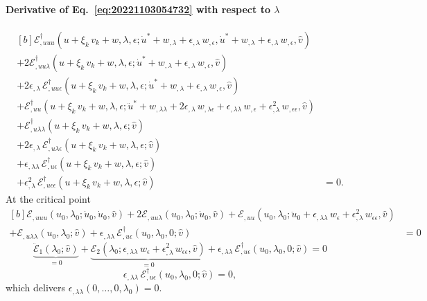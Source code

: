\documentclass[12pt, final]{scrartcl}
\theoremstyle{definition}
\newcommand{\E}{\mathcal E}
\newcommand{\EE}{\mathcal E ^ \dagger}
\begin{document}
\paragraph{Derivative of Eq.~\eqref{eq:20221103054732} with respect to \(\lambda\)}
\begin{equation}
  \begin{aligned}[b]
    \EE_{,uuu}(u + \xi_k \, v_k + w, \lambda, \epsilon; \dot{u}^\ast + w_{,\lambda} + \epsilon_{,\lambda} \, w_{,\epsilon}, \dot{u}^\ast + w_{,\lambda} + \epsilon_{,\lambda} \, w_{,\epsilon}, \hat{v}) &\\
    + 2\EE_{,uu\lambda}(u + \xi_k \, v_k + w, \lambda, \epsilon; \dot{u}^\ast + w_{,\lambda} + \epsilon_{,\lambda} \, w_{,\epsilon}, \hat{v}) &\\
    + 2\epsilon_{,\lambda} \, \EE_{,uu\epsilon}(u + \xi_k \, v_k + w, \lambda, \epsilon; \dot{u}^\ast + w_{,\lambda} + \epsilon_{,\lambda} \, w_{,\epsilon}, \hat{v}) &\\
    + \EE_{,uu}(u + \xi_k \, v_k + w, \lambda, \epsilon; \ddot{u}^\ast + w_{,\lambda\lambda} + 2\epsilon_{,\lambda} \, w_{,\lambda\epsilon} + \epsilon_{,\lambda\lambda} \, w_{,\epsilon} + \epsilon_{,\lambda}^2 \, w_{,\epsilon\epsilon}, \hat{v}) &\\
    + \EE_{,u\lambda\lambda}(u + \xi_k \, v_k + w, \lambda, \epsilon; \hat{v})&\\
    + 2\epsilon_{,\lambda} \, \EE_{,u\lambda\epsilon}(u + \xi_k \, v_k + w, \lambda, \epsilon; \hat{v}) &\\
    + \epsilon_{,\lambda\lambda} \, \EE_{,u\epsilon}(u + \xi_k \, v_k + w, \lambda, \epsilon; \hat{v}) &\\
    + \epsilon_{,\lambda}^2 \, \EE_{,u\epsilon\epsilon}(u + \xi_k \, v_k + w, \lambda, \epsilon; \hat{v}) &= 0.
  \end{aligned}
\end{equation}
At the critical point
\begin{equation*}
  \begin{aligned}[b]
    \E_{,uuu}(u_0, \lambda_0; \dot{u}_0, \dot{u}_0, \hat{v}) + 2\E_{,uu\lambda}(u_0, \lambda_0; \dot{u}_0, \hat{v}) + \E_{,uu}(u_0, \lambda_0; \ddot{u}_0 + \epsilon_{,\lambda\lambda} \, w_\epsilon + \epsilon_{,\lambda}^2 \, w_{\epsilon\epsilon}, \hat{v}) &\\
    + \E_{,u\lambda\lambda}(u_0, \lambda_0; \hat{v}) + \epsilon_{,\lambda\lambda} \, \EE_{,u\epsilon}(u_0, \lambda_0, 0; \hat{v}) &= 0
  \end{aligned}
\end{equation*}
\begin{equation*}
  \underbrace{\ddot{\E}_1(\lambda_0; \hat{v})}_{=0}
  + \underbrace{\E_2(\lambda_0; \epsilon_{,\lambda\lambda} \, w_\epsilon + \epsilon_{,\lambda}^2 \, w_{\epsilon\epsilon}, \hat{v})}_{=0}
  + \epsilon_{,\lambda\lambda} \, \EE_{,u\epsilon}(u_0, \lambda_0, 0; \hat{v}) = 0
\end{equation*}
\begin{equation}
  \epsilon_{,\lambda\lambda} \, \EE_{,u\epsilon}(u_0, \lambda_0, 0; \hat{v}) = 0,
\end{equation}
which delivers \(\epsilon_{,\lambda\lambda}(0, \ldots, 0, \lambda_0) = 0\).
\end{document}
